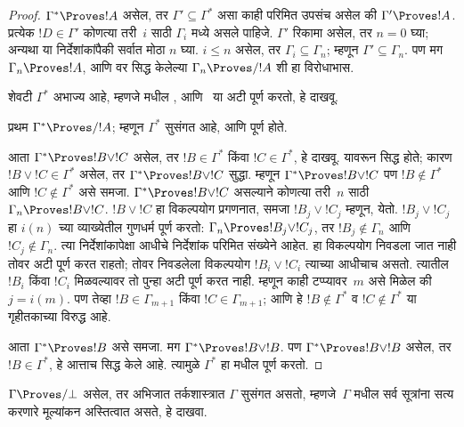 \documentclass[../../../include/open-logic-section]{subfiles}
\begin{document}
\begin{proof}
  $\Gamma^* \Proves !A$ असेल, तर
  $\Gamma' \subseteq \Gamma^*$
  असा काही परिमित उपसंच असेल की
  $\Gamma' \Proves !A$.
  प्रत्येक $!D \in \Gamma'$ कोणत्या
  तरी~$i$ साठी $\Gamma_i$ मध्ये असले
  पाहिजे. $\Gamma'$ रिकामा असेल, तर $n=0$ घ्या;
  अन्यथा या निर्देशांकांपैकी सर्वात मोठा $n$ घ्या. $i \le n$ असेल, तर
  $\Gamma_i \subseteq \Gamma_n$;
  म्हणून $\Gamma' \subseteq \Gamma_n$.
  पण मग $\Gamma_n \Proves !A$,
  आणि वर सिद्ध केलेल्या
  $\Gamma_n \Proves/ !A$ शी हा विरोधाभास.

  शेवटी $\Gamma^*$ अभाज्य आहे,
  म्हणजे  मधील
  ,
   आणि~
   या अटी
  पूर्ण करतो, हे दाखवू.

  प्रथम $\Gamma^* \Proves/ !A$;
  म्हणून $\Gamma^*$ सुसंगत आहे,
  आणि  पूर्ण होते.

  आता $\Gamma^* \Proves !B \lor !C$
  असेल, तर $!B \in \Gamma^*$
  किंवा $!C \in \Gamma^*$,
  हे दाखवू. यावरून
   सिद्ध होते;
  कारण $!B \lor !C \in \Gamma^*$
  असेल, तर $\Gamma^* \Proves !B
  \lor !C$ सुद्धा. म्हणून
  $\Gamma^* \Proves !B \lor !C$
  पण $!B \notin \Gamma^*$
  आणि $!C \notin \Gamma^*$
  असे समजा.
  $\Gamma^* \Proves !B \lor !C$
  असल्याने कोणत्या तरी~$n$ साठी
  $\Gamma_n \Proves !B \lor !C$.
  $!B \lor !C$ हा विकल्पयोग
  प्रगणनात, समजा $!B_j \lor !C_j$
  म्हणून, येतो.
  $!B_j \lor !C_j$ हा
  $i(n)$ च्या व्याख्येतील गुणधर्म
  पूर्ण करतो: $\Gamma_n \Proves !B_j
  \lor !C_j$, तर
  $!B_j \notin \Gamma_n$ आणि
  $!C_j \notin \Gamma_n$.
  त्या निर्देशांकापेक्षा आधीचे निर्देशांक
  परिमित संख्येने आहेत. हा विकल्पयोग
  निवडला जात नाही तोवर अटी पूर्ण करत
  राहतो; तोवर निवडलेला विकल्पयोग
  $!B_i \lor !C_i$ त्याच्या आधीचाच असतो.
  त्यातील $!B_i$ किंवा $!C_i$
  मिळवल्यावर तो पुन्हा अटी पूर्ण करत नाही.
  म्हणून काही टप्प्यावर~$m$
  असे मिळेल की $j = i(m)$.
  पण तेव्हा $!B \in \Gamma_{m+1}$
  किंवा $!C \in \Gamma_{m+1}$;
  आणि हे $!B \notin \Gamma^*$
  व $!C \notin \Gamma^*$ या
  गृहीतकाच्या विरुद्ध आहे.

  आता $\Gamma^* \Proves !B$
  असे समजा. मग
  $\Gamma^* \Proves !B \lor !B$.
  पण $\Gamma^* \Proves !B \lor !B$
  असेल, तर $!B \in \Gamma^*$,
  हे आत्ताच सिद्ध केले आहे.
  त्यामुळे $\Gamma^*$ हा
   मधील
   पूर्ण करतो.
\end{proof}

\begin{prob}
$\Gamma \Proves/ \bot$ असेल, तर
अभिजात तर्कशास्त्रात $\Gamma$ सुसंगत
असतो, म्हणजे~$\Gamma$ मधील सर्व सूत्रांना
सत्य करणारे मूल्यांकन अस्तित्वात असते,
हे दाखवा.
\end{prob}
\end{document}
